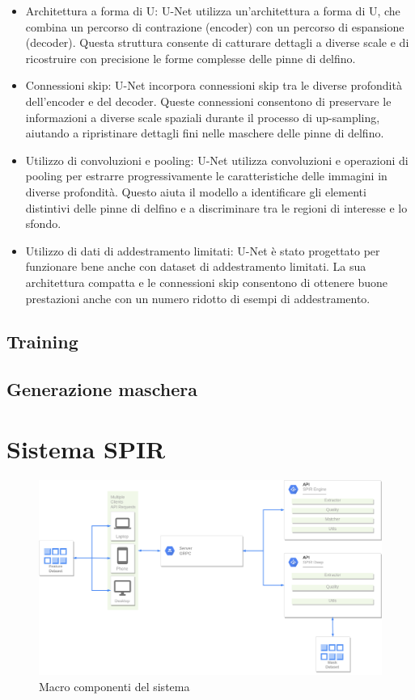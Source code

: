 \documentclass[a4paper,12pt]{report}
\begin{document}
      \begin{itemize}
        \item Architettura a forma di U: U-Net utilizza un'architettura a forma di U, che combina un percorso di contrazione (encoder) con un percorso di espansione (decoder). Questa struttura consente di catturare dettagli a diverse scale e di ricostruire con precisione le forme complesse delle pinne di delfino.
        \item Connessioni skip: U-Net incorpora connessioni skip tra le diverse profondità dell'encoder e del decoder. Queste connessioni consentono di preservare le informazioni a diverse scale spaziali durante il processo di up-sampling, aiutando a ripristinare dettagli fini nelle maschere delle pinne di delfino.
        \item Utilizzo di convoluzioni e pooling: U-Net utilizza convoluzioni e operazioni di pooling per estrarre progressivamente le caratteristiche delle immagini in diverse profondità. Questo aiuta il modello a identificare gli elementi distintivi delle pinne di delfino e a discriminare tra le regioni di interesse e lo sfondo.
        \item Utilizzo di dati di addestramento limitati: U-Net è stato progettato per funzionare bene anche con dataset di addestramento limitati. La sua architettura compatta e le connessioni skip consentono di ottenere buone prestazioni anche con un numero ridotto di esempi di addestramento.
      \end{itemize}
    \subsection{Training}
    \subsection{Generazione maschera}

    \section{Sistema SPIR}
    \begin{figure}[H]
      \centering
      \includegraphics[width=\textwidth]{assets/images/methods/backend/backend_server.drawio.png}   
      \caption{Macro componenti del sistema}
    \end{figure}
    
\end{document}
